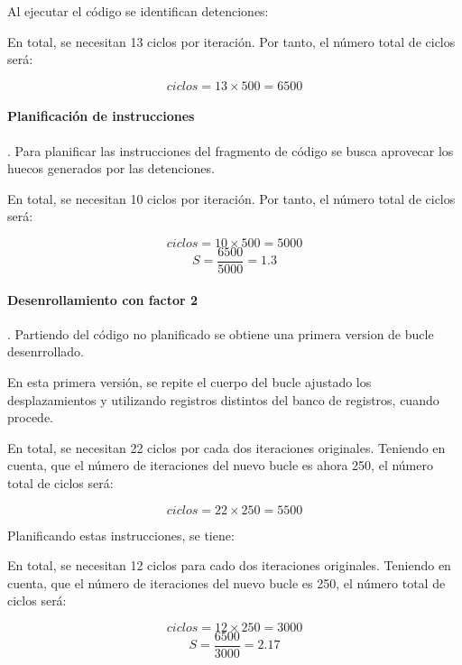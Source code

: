 Al ejecutar el código se identifican detenciones:



En total, se necesitan 13 ciclos por iteración.
Por tanto, el número total de ciclos será:

\[
ciclos = 13 \times 500 = 6500
\]

\paragraph{Planificación de instrucciones}.
Para planificar las instrucciones del fragmento de código se busca aprovecar los
huecos generados por las detenciones.



En total, se necesitan 10 ciclos por iteración.
Por tanto, el número total de ciclos será:

\[
ciclos = 10 \times 500 = 5000
\]
\[
S = \frac{6500}{5000} = 1.3
\]

\paragraph{Desenrollamiento con factor 2}.
Partiendo del código no planificado se obtiene una primera
version de bucle desenrrollado.



En esta primera versión, se repite el cuerpo del bucle ajustado los
desplazamientos y utilizando registros distintos del banco de registros,
cuando procede.

En total, se necesitan 22 ciclos por cada dos iteraciones originales.
Teniendo en cuenta, que el número de iteraciones del nuevo bucle es ahora 250,
el número total de ciclos será:

\[
ciclos = 22 \times 250 = 5500
\]

Planificando estas instrucciones, se tiene:



En total, se necesitan 12 ciclos para cado dos iteraciones originales.
Teniendo en cuenta, que el número de iteraciones del nuevo bucle es 250,
el número total de ciclos será:

\[
ciclos = 12 \times 250 = 3000
\]
\[
S = \frac{6500}{3000} = 2.17
\]

